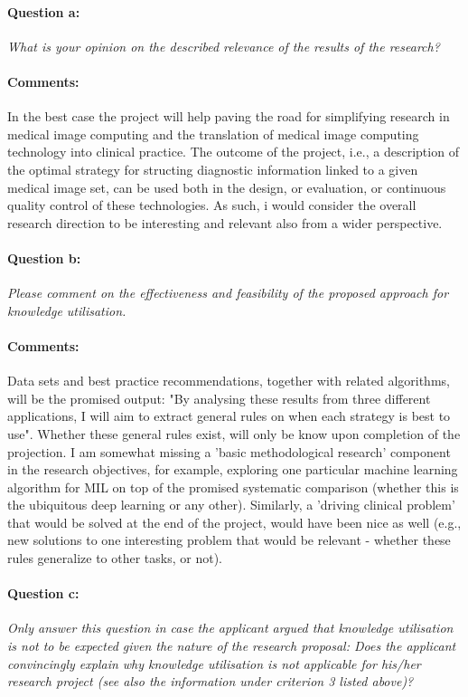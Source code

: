 \documentclass[serif, twocolumn, numeric, rga]{jote-article}
\begin{document}
\paragraph{Question a:}
\textit{What is your opinion on the described relevance of the results of the research?}

\paragraph{Comments:}

In the best case the project will help paving the road for simplifying research in medical image computing and the translation of medical image computing technology into clinical practice. The outcome of the project, i.e., a description of the optimal strategy for structing diagnostic information linked to a given medical image set, can be used both in the design, or evaluation, or continuous quality control of these technologies. As such, i would consider the overall research direction to be interesting and relevant also from a wider perspective.

\paragraph{Question b:}
\textit{Please comment on the effectiveness and feasibility of the proposed approach for knowledge utilisation.}

\paragraph{Comments:}

Data sets and best practice recommendations, together with related algorithms, will be the promised output: "By analysing these results from three different applications, I will aim to extract general rules on when each strategy is best to use". Whether these general rules exist, will only be know upon completion of the projection. I am somewhat missing a 'basic methodological research' component in the research objectives, for example, exploring one particular machine learning algorithm for MIL on top of the promised systematic comparison (whether this is the ubiquitous deep learning or any other). Similarly, a 'driving clinical problem' that would be solved at the end of the project, would have been nice as well (e.g., new solutions to one interesting problem that would be relevant - whether these rules generalize to other tasks, or not).

\paragraph{Question c:}
\textit{Only answer this question in case the applicant argued that knowledge utilisation is not to be expected given the nature of the research proposal: Does the applicant convincingly explain why knowledge utilisation is not applicable for his/her research project (see also the information under criterion 3 listed above)?}
\end{document}
